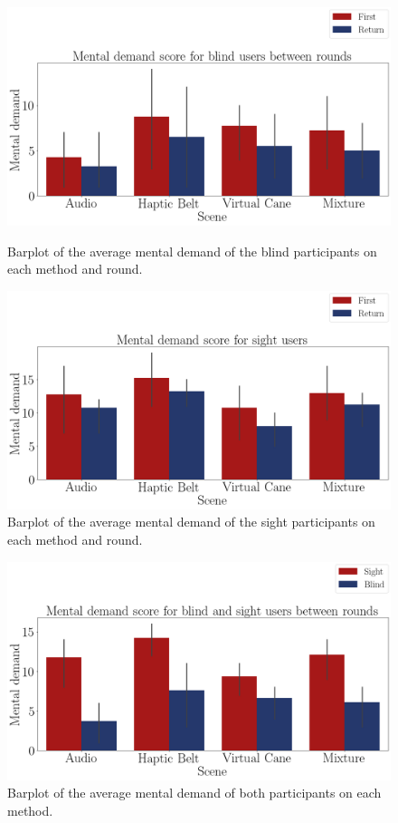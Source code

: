\begin{figure}[!htb]
    \centering
    \begin{minipage}{\textwidth}
        \centering
        \includegraphics[width = 0.8\linewidth]{Resultados/Nasa/Figuras/png/barplot_md_avg_4_scene_blind.png}
        \caption{Barplot of the average mental demand of the blind participants on each method and round.}
        \label{fig:barplot_md_avg_4_scene_blind}
    \end{minipage}
    \begin{minipage}{\textwidth}
        \centering
        \includegraphics[width = 0.8\linewidth]{Resultados/Nasa/Figuras/png/barplot_md_avg_4_scene_sight.png}
        \caption{Barplot of the average mental demand of the sight participants on each method and round.}
        \label{fig:barplot_md_avg_4_scene_sight}
    \end{minipage}
\end{figure}
\begin{figure}[!htb]
    \centering
    \includegraphics[width = 0.8\linewidth]{Resultados/Nasa/Figuras/png/barplot_md_avg_4_scene.png}
    \caption{Barplot of the average mental demand of both participants on each method.}
    \label{fig:barplot_md_avg_4_scene}
\end{figure}

